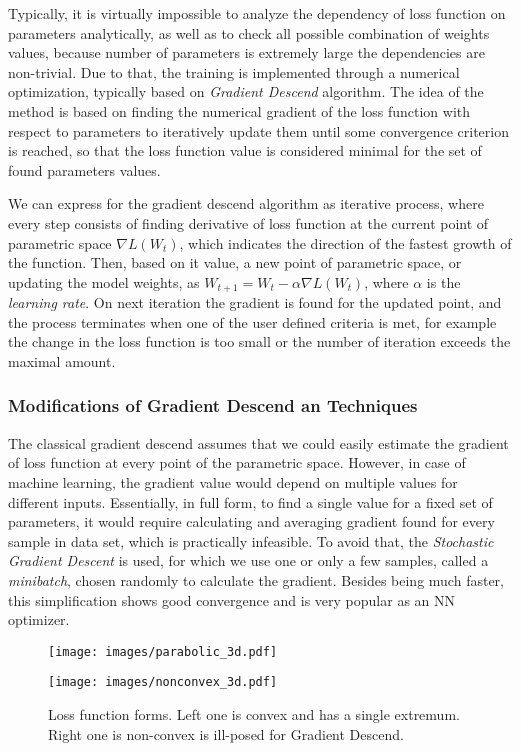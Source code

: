 Typically, it is virtually impossible to analyze the dependency of loss function on parameters analytically, as well as to check all possible combination of weights values, because number of parameters is extremely large the dependencies are non-trivial. 
Due to that, the training is implemented through a numerical optimization, typically based on \emph{Gradient Descend} algorithm. 
The idea of the method is based on finding the numerical gradient of the loss function with respect to parameters to iteratively update them until some convergence criterion is reached, so that the loss function value is considered minimal for the set of found parameters values.
\medskip

We can express for the gradient descend algorithm as iterative process, where every step consists of finding derivative of loss function at the current point of parametric space $\nabla L(W_{t})$, which indicates the direction of the fastest growth of the function. 
Then, based on it value, a new point of parametric space, or updating the model weights, as $W_{t+1}=W_{t}-\alpha \nabla L(W_{t})$, where $\alpha$ is the \emph{learning rate}.
On next iteration the gradient is found for the updated point, and the process terminates when one of the user defined criteria is met, for example the change in the loss function is too small or the number of iteration exceeds the maximal amount.
\medskip

\subsubsection{Modifications of Gradient Descend an Techniques}

The classical gradient descend assumes that we could easily estimate the gradient of loss function at every point of the parametric space.
However, in case of machine learning, the gradient value would depend on multiple values for different inputs.
Essentially, in full form, to find a single value for a fixed set of parameters, it would require calculating and averaging gradient found for every sample in data set, which is practically infeasible.
To avoid that, the \emph{Stochastic Gradient Descent} is used, for which we use one or only a few samples, called a \emph{minibatch}, chosen randomly to calculate the gradient.
Besides being much faster, this simplification shows good convergence and is very popular as an NN optimizer\cite{}.

\begin{figure*}
	\begin{multicols}{2}
		\texttt{[image: images/parabolic\_3d.pdf]}\par
		\texttt{[image: images/nonconvex\_3d.pdf]}\par
	\end{multicols}
	\caption{Loss function forms. Left one is convex and has a single extremum. Right one is non-convex is ill-posed for Gradient Descend. }
	\label{fig:lossfunc_demo}
\end{figure*}
	
